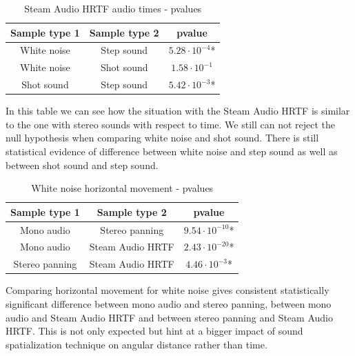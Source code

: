 \documentclass[conference]{IEEEtran}
\begin{document}
\begin{table}[htbp]
\caption{Steam Audio HRTF audio times - pvalues}
\begin{center}
\begin{tabular}{|c|c|c|}
\hline
\textbf{Sample type 1} & \textbf{Sample type 2} & \textbf{pvalue}\\
\hline
White noise & Step sound & $5.28 \cdot 10^{-4}$*\\
\hline
White noise & Shot sound & $1.58 \cdot 10^{-1}$\\
\hline
Shot sound & Step sound & $5.42 \cdot 10^{-3}$*\\
\hline
\end{tabular}
\label{tab7}
\end{center}
\end{table}

In this table we can see how the situation with the Steam Audio HRTF is similar to the one with stereo sounds with respect to time. We still can not reject the null hypothesis when comparing white noise and shot sound. There is still statistical evidence of difference between white noise and step sound as well as between shot sound and step sound.

\begin{table}[htbp]
\caption{White noise horizontal movement - pvalues}
\begin{center}
\begin{tabular}{|c|c|c|}
\hline
\textbf{Sample type 1} & \textbf{Sample type 2} & \textbf{pvalue}\\
\hline
Mono audio & Stereo panning & $9.54 \cdot 10^{-10}$*\\
\hline
Mono audio & Steam Audio HRTF & $2.43 \cdot 10^{-20}$*\\
\hline
Stereo panning & Steam Audio HRTF & $4.46 \cdot 10^{-3}$*\\
\hline
\end{tabular}
\label{tab11}
\end{center}
\end{table}

Comparing horizontal movement for white noise gives consistent statistically significant difference between mono audio and stereo panning, between mono audio and Steam Audio HRTF and between stereo panning and Steam Audio HRTF. This is not only expected but hint at a bigger impact of sound spatialization technique on angular distance rather than time. 
\end{document}

